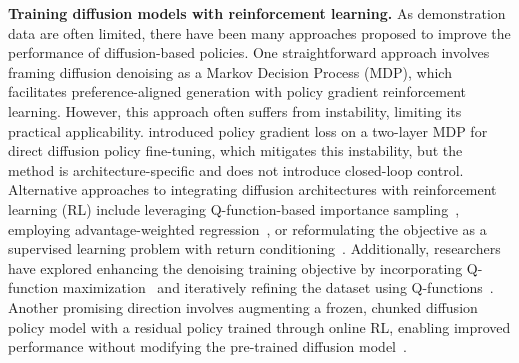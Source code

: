 \textbf{Training diffusion models with reinforcement learning.} As demonstration data are often limited, there have been many approaches proposed to improve the performance of diffusion-based policies. 
One straightforward approach \cite{DBLP:conf/iclr/BlackJDKL24, fan2024reinforcement} involves framing diffusion denoising as a Markov Decision Process (MDP), which facilitates preference-aligned generation with policy gradient reinforcement learning. However, this approach often suffers from instability, limiting its practical applicability. \cite{dppo} introduced policy gradient loss on a two-layer MDP for direct diffusion policy fine-tuning, which mitigates this instability, but the method is architecture-specific and does not introduce closed-loop control. 
Alternative approaches to integrating diffusion architectures with reinforcement learning (RL) include leveraging Q-function-based importance sampling~\cite{idql}, employing advantage-weighted regression~\cite{goo2022know}, or reformulating the objective as a supervised learning problem with return conditioning~\cite{chen2021decision,janner2022planning,ajayconditional}.
Additionally, researchers have explored enhancing the denoising training objective by incorporating Q-function maximization~\cite{wang2022diffusion} and iteratively refining the dataset using Q-functions~\cite{yang2023policy}. 
Another promising direction involves augmenting a frozen, chunked diffusion policy model with a residual policy trained through online RL, enabling improved performance without modifying the pre-trained diffusion model~\cite{ankile2024imitation}.




